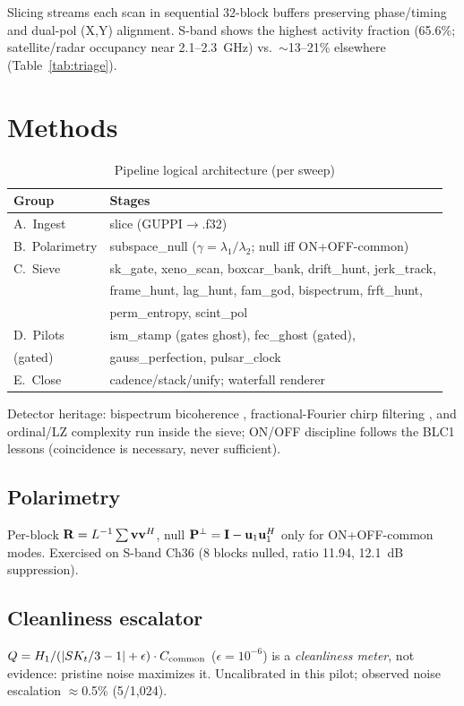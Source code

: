 \documentclass[twocolumn]{aastex631}
\begin{document}
Slicing streams each scan in sequential 32-block buffers preserving phase/timing and dual-pol (X,Y) alignment. S-band shows the highest activity fraction (65.6\%; satellite/radar occupancy near 2.1--2.3~GHz) vs.\ $\sim$13--21\% elsewhere (Table~\ref{tab:triage}).

\section{Methods}
\label{sec:methods}

\begin{table}[t]
\centering
\caption{Pipeline logical architecture (per sweep)}
\label{tab:arch}
\begin{tabular}{ll}
\toprule
Group & Stages \\
\midrule
A.\ Ingest & slice (GUPPI$\rightarrow$.f32) \\
B.\ Polarimetry & subspace\_null ($\gamma=\lambda_1/\lambda_2$; null iff ON+OFF-common) \\
C.\ Sieve & sk\_gate, xeno\_scan, boxcar\_bank, drift\_hunt, jerk\_track, \\
          & frame\_hunt, lag\_hunt, fam\_god, bispectrum, frft\_hunt, \\
          & perm\_entropy, scint\_pol \\
D.\ Pilots & ism\_stamp (gates ghost), fec\_ghost (gated), \\
(gated)    & gauss\_perfection, pulsar\_clock \\
E.\ Close & cadence/stack/unify; waterfall renderer \\
\bottomrule
\end{tabular}
\end{table}

Detector heritage: bispectrum bicoherence \citep{kim1979}, fractional-Fourier chirp filtering \citep{ozaktas2001}, and ordinal/LZ complexity \citep{rosso2007} run inside the sieve; ON/OFF discipline follows the \citet{sheikh2021} BLC1 lessons (coincidence is necessary, never sufficient).

\subsection{Polarimetry}
Per-block ${\bf R}=L^{-1}\sum{\bf vv}^H$, null ${\bf P}^\perp={\bf I}-{\bf u}_1{\bf u}_1^H$ only for ON+OFF-common modes. Exercised on S-band Ch36 (8 blocks nulled, ratio 11.94, 12.1~dB suppression).

\subsection{Cleanliness escalator}
$Q=H_1/(|SK_t/3-1|+\epsilon)\cdot C_{\rm common}$ ($\epsilon=10^{-6}$) is a \textit{cleanliness meter}, not evidence: pristine noise maximizes it. Uncalibrated in this pilot; observed noise escalation $\approx$0.5\% (5/1,024).
\end{document}
